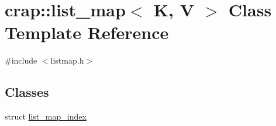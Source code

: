 \hypertarget{classcrap_1_1list__map}{}\section{crap\+:\+:list\+\_\+map$<$ K, V $>$ Class Template Reference}
\label{classcrap_1_1list__map}


{\ttfamily \#include $<$listmap.\+h$>$}

\subsection*{Classes}
\begin{DoxyCompactItemize}
\item 
struct \hyperlink{structcrap_1_1list__map_1_1list__map__index}{list\+\_\+map\+\_\+index}
\end{DoxyCompactItemize}
